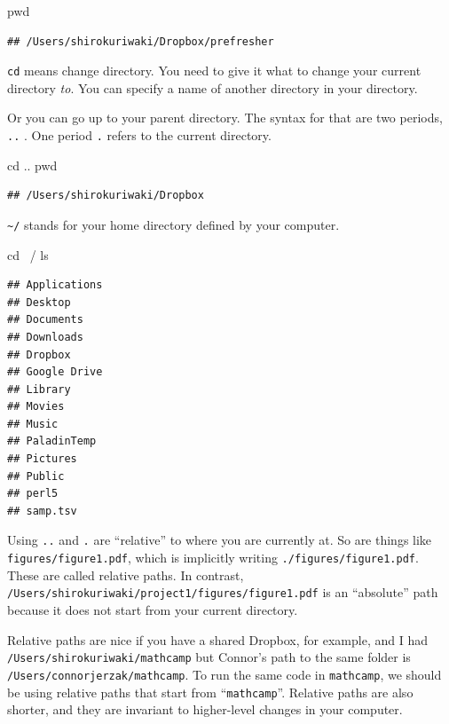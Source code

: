 \documentclass[]{book}
\newenvironment{Shaded}{\begin{snugshade}}{\end{snugshade}}
\newcommand{\BuiltInTok}[1]{#1}
\newcommand{\FunctionTok}[1]{\textcolor[rgb]{0.00,0.00,0.00}{#1}}
\newcommand{\NormalTok}[1]{#1}
\theoremstyle{definition}
\theoremstyle{definition}
\theoremstyle{definition}
\theoremstyle{remark}
\begin{document}
\begin{Shaded}
\begin{Highlighting}[]
\BuiltInTok{pwd}
\end{Highlighting}
\end{Shaded}

\begin{verbatim}
## /Users/shirokuriwaki/Dropbox/prefresher
\end{verbatim}

\texttt{cd} means change directory. You need to give it what to change your current directory \emph{to}. You can specify a name of another directory in your directory.

Or you can go up to your parent directory. The syntax for that are two periods, \texttt{..} . One period \texttt{.} refers to the current directory.

\begin{Shaded}
\begin{Highlighting}[]
\BuiltInTok{cd}\NormalTok{ ..}
\BuiltInTok{pwd}
\end{Highlighting}
\end{Shaded}

\begin{verbatim}
## /Users/shirokuriwaki/Dropbox
\end{verbatim}

\texttt{\textasciitilde{}/} stands for your home directory defined by your computer.

\begin{Shaded}
\begin{Highlighting}[]
\BuiltInTok{cd}\NormalTok{ ~/}
\FunctionTok{ls}
\end{Highlighting}
\end{Shaded}

\begin{verbatim}
## Applications
## Desktop
## Documents
## Downloads
## Dropbox
## Google Drive
## Library
## Movies
## Music
## PaladinTemp
## Pictures
## Public
## perl5
## samp.tsv
\end{verbatim}

Using \texttt{..} and \texttt{.} are ``relative'' to where you are currently at. So are things like \texttt{figures/figure1.pdf}, which is implicitly writing \texttt{./figures/figure1.pdf}. These are called relative paths. In contrast, \texttt{/Users/shirokuriwaki/project1/figures/figure1.pdf} is an ``absolute'' path because it does not start from your current directory.

Relative paths are nice if you have a shared Dropbox, for example, and I had \texttt{/Users/shirokuriwaki/mathcamp} but Connor's path to the same folder is \texttt{/Users/connorjerzak/mathcamp}. To run the same code in \texttt{mathcamp}, we should be using relative paths that start from ``\texttt{mathcamp}''. Relative paths are also shorter, and they are invariant to higher-level changes in your computer.
\end{document}
